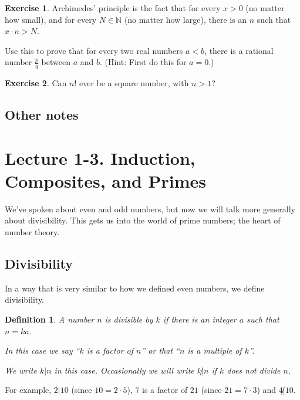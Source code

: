 \documentclass[11pt]{article}
\newtheorem{dfn}[thm]{Definition}
\theoremstyle{definition}
\newtheorem{exercise}{Exercise}
\numberwithin{thm}{section}
\begin{document}
\begin{exercise} Archimedes' principle is the fact that for every $x > 0$ (no matter how small), and for every $N \in \mathbb{N}$ (no matter how large), there is an $n$ such that $x\cdot n > N$.

Use this to prove that for every two real numbers $a < b$, there is a rational number $\frac{p}{q}$ between $a$ and $b$. (Hint: First do this for $a=0$.)
\end{exercise}

\begin{exercise} Can $n!$ ever be a square number, with $n>1$?
\end{exercise}

\subsection{Other notes}




\newpage
\section{Lecture 1-3. Induction, Composites, and Primes}

We've spoken about even and odd numbers, but now we will talk more generally about divisibility. This gets us into the world of prime numbers; the heart of number theory.

\subsection{Divisibility}

In a way that is very similar to how we defined even numbers, we define divisibility.

\begin{dfn} A number $n$ is divisible by $k$ if there is an integer $a$ such that $n = ka$.

In this case we say ``$k$ is a factor of $n$'' or that ``$n$ is a multiple of $k$''.

We write $k|n$ in this case. Occasionally we will write $k \not | n$ if $k$ does not divide $n$.
\end{dfn}

For example, $2 | 10$ (since $10 = 2 \cdot 5$), $7$ is a factor of $21$ (since $21 = 7 \cdot 3$) and $4 \not | 10$.
\end{document}
